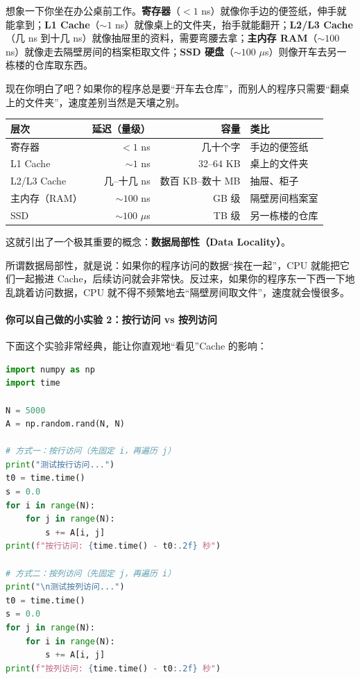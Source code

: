 想象一下你坐在办公桌前工作。\textbf{寄存器}（$<1$ ns）就像你手边的便签纸，伸手就能拿到；\textbf{L1 Cache}（$\sim 1$ ns）就像桌上的文件夹，抬手就能翻开；\textbf{L2/L3 Cache}（几 ns 到十几 ns）就像抽屉里的资料，需要弯腰去拿；\textbf{主内存 RAM}（$\sim 100$ ns）就像走去隔壁房间的档案柜取文件；\textbf{SSD 硬盘}（$\sim 100$ $\mu$s）则像开车去另一栋楼的仓库取东西。

现在你明白了吧？如果你的程序总是要“开车去仓库”，而别人的程序只需要“翻桌上的文件夹”，速度差别当然是天壤之别。

\begin{center}
\renewcommand{\arraystretch}{1.3}
\begin{tabular}{l|r|r|l}
\toprule
\textbf{层次} & \textbf{延迟（量级）} & \textbf{容量} & \textbf{类比} \\
\midrule
寄存器 & $< 1$ ns & 几十个字 & 手边的便签纸 \\
L1 Cache & $\sim 1$ ns & 32--64 KB & 桌上的文件夹 \\
L2/L3 Cache & 几--十几 ns & 数百 KB--数十 MB & 抽屉、柜子 \\
主内存（RAM） & $\sim 100$ ns & GB 级 & 隔壁房间档案室 \\
SSD & $\sim 100$ $\mu$s & TB 级 & 另一栋楼的仓库 \\
\bottomrule
\end{tabular}
\end{center}

这就引出了一个极其重要的概念：\textbf{数据局部性（Data Locality）}。

所谓数据局部性，就是说：如果你的程序访问的数据“挨在一起”，CPU 就能把它们一起搬进 Cache，后续访问就会非常快。反过来，如果你的程序东一下西一下地乱跳着访问数据，CPU 就不得不频繁地去“隔壁房间取文件”，速度就会慢很多。

\paragraph{你可以自己做的小实验 2：按行访问 vs 按列访问}

下面这个实验非常经典，能让你直观地“看见”Cache 的影响：

\begin{lstlisting}[style=teaching, language=Python]
import numpy as np
import time

N = 5000
A = np.random.rand(N, N)

# 方式一：按行访问（先固定 i，再遍历 j）
print("测试按行访问...")
t0 = time.time()
s = 0.0
for i in range(N):
    for j in range(N):
        s += A[i, j]
print(f"按行访问: {time.time() - t0:.2f} 秒")

# 方式二：按列访问（先固定 j，再遍历 i）
print("\n测试按列访问...")
t0 = time.time()
s = 0.0
for j in range(N):
    for i in range(N):
        s += A[i, j]
print(f"按列访问: {time.time() - t0:.2f} 秒")
\end{lstlisting}

